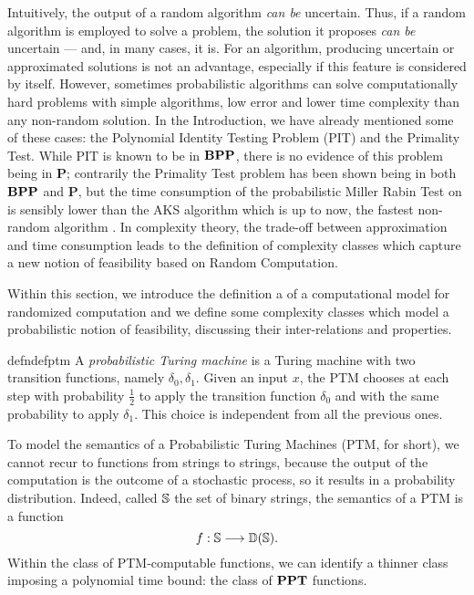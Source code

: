 Intuitively, the output of a random algorithm \emph{can be}
uncertain. Thus, if a random algorithm is employed to solve a
problem, the solution it proposes \emph{can be} uncertain ---
and, in many cases, it is.
%
For an algorithm, producing  uncertain or approximated solutions is not an advantage,
especially if this feature is considered by itself. However,
sometimes probabilistic algorithms can solve computationally
hard problems with simple algorithms, low error and lower time
complexity than any non-random solution.
In the Introduction, we have already mentioned some of
these cases: the Polynomial Identity Testing Problem (PIT) and the Primality Test.
While PIT is known to be in $\mathbf{BPP}$,
there is no evidence of this problem being in $\mathbf P$; contrarily the
Primality Test problem has been shown being in both $\mathbf{BPP}$ and $\mathbf P$,
but the time consumption of the probabilistic Miller Rabin Test
on is sensibly lower than the AKS
algorithm which is up to now, the fastest non-random algorithm \cite{shoup2009computational}.
%
In complexity theory, the trade-off between approximation and time
consumption leads to the definition of complexity classes which
capture a new notion of feasibility based on Random Computation.

Within this section, we introduce the definition a of a
computational model for randomized computation and we define some
complexity classes which model a probabilistic notion of
feasibility, discussing their inter-relations and properties.

\begin{restatable}{defn}{defptm}
  \label{def:ptminformal}
A \emph{probabilistic Turing machine}
is a Turing machine with two transition functions, namely $\delta_0,\delta_1$.
%
Given an input $x$, the PTM chooses at each step
with probability $\frac{1}{2}$ to apply
the transition function $\delta_0$ and with the same probability to apply $\delta_1$.
%
This choice is independent from all the previous ones.
\end{restatable}

To model the semantics of a Probabilistic Turing Machines (PTM, for short),
we cannot recur to functions from strings to strings, because the output
of the computation is the outcome of a stochastic process, so it results in
a probability distribution. Indeed, called $\mathbb{S}$ the set of binary strings, the semantics
of a PTM is a function
$$
f: \mathbb{S} \longrightarrow \mathbb D (\mathbb{S}).
$$
\noindent
Within the class of PTM-computable functions, we can identify a thinner class
imposing a polynomial time bound: the class of $\mathbf{PPT}$ functions.


